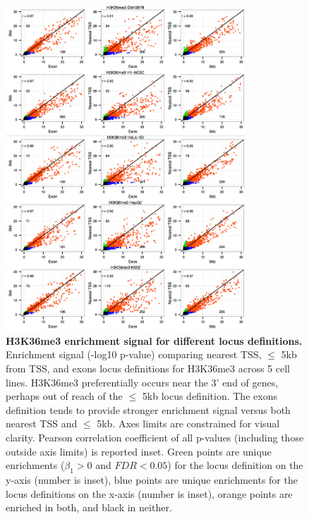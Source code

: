 \begin{figure}[ht!]
\centering
\includegraphics[width=0.8\textwidth]{chap2figs/figure2_7.pdf}
\caption[H3K36me3 enrichment signal for different locus definitions.]
{
\textbf{H3K36me3 enrichment signal for different locus definitions.} Enrichment signal (-log10 p-value) comparing nearest TSS, $\leq$ 5kb from TSS, and exons locus definitions for H3K36me3 across 5 cell lines. H3K36me3 preferentially occurs near the 3' end of genes, perhaps out of reach of the $\leq$ 5kb locus definition. The exons definition tends to provide stronger enrichment signal versus both nearest TSS and $\leq$ 5kb. Axes limits are constrained for visual clarity. Pearson correlation coefficient of all p-values (including those outside axis limits) is reported inset. Green points are unique enrichments ($\beta_1 > 0$ and $FDR < 0.05$) for the locus definition on the y-axis (number is inset), blue points are unique enrichments for the locus definitions on the x-axis (number is inset), orange points are enriched in both, and black in neither.
}
\label{chap2:fig:7}
\end{figure}


